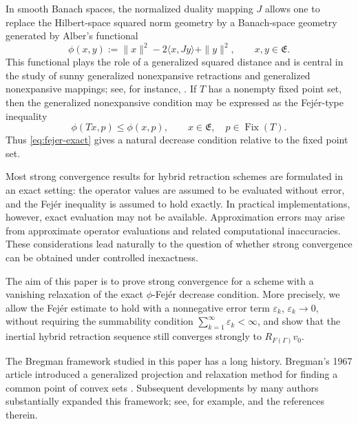 \documentclass[leqno,12pt]{amsart}
\theoremstyle{definition}
\theoremstyle{remark}
\numberwithin{equation}{section}
\newcommand{\E}{\mathfrak{E}}
\newcommand{\Fix}{\operatorname{Fix}}
\begin{document}
In smooth Banach spaces, the normalized duality mapping \(J\) allows one to
replace the Hilbert-space squared norm geometry by a Banach-space geometry
generated by Alber's functional
\begin{equation}\label{eq:intro-phi}
\phi(x,y):=\|x\|^{2}-2\langle x,Jy\rangle+\|y\|^{2},
\qquad x,y\in \E.
\end{equation}
This functional plays the role of a generalized squared distance and is central
in the study of sunny generalized nonexpansive retractions and generalized
nonexpansive mappings; see, for instance,
\cite{Alber1996,IbarakiTakahashi2010,KohsakaTakahashi2007}. If \(T\)
has a nonempty fixed point set, then the generalized nonexpansive condition may
be expressed as the Fej\'er-type inequality
\begin{equation}\label{eq:fejer-exact}
\phi(Tx,p)\leq \phi(x,p),
\qquad x\in \E,\quad p\in \Fix(T).
\end{equation}
Thus \eqref{eq:fejer-exact} gives a natural decrease condition relative to the
fixed point set.

Most strong convergence results for hybrid retraction schemes are formulated in
an exact setting: the operator values are assumed to be evaluated without error,
and the Fej\'er inequality is assumed to hold exactly. In practical
implementations, however, exact evaluation may not be available. Approximation
errors may arise from approximate operator evaluations and related computational
inaccuracies. These considerations lead naturally to the question of whether
strong convergence can be obtained under controlled inexactness.

The aim of this paper is to prove strong convergence for a scheme with a
vanishing relaxation of the exact \(\phi\)-Fej\'er decrease condition. More
precisely, we allow the Fej\'er estimate to hold with a nonnegative error term \(\varepsilon_k\), 
\(\varepsilon_k\to0\), without requiring the summability condition
\(\sum_{k=1}^{\infty}\varepsilon_k<\infty\), and show that the inertial hybrid
retraction sequence still converges strongly to \(R_{F(\Gamma)}v_0\).

The Bregman framework studied in this paper has a long history. Bregman's 1967
article introduced a generalized projection and relaxation method for finding a
common point of convex sets \cite{Bregman1967}. Subsequent developments by many
authors substantially expanded this framework; see, for example,
\cite{CensorLent1981,CensorZenios1992,BauschkeBorwein1997,
ButnariuIusem2000,KohsakaTakahashi2005} and the references therein.
\end{document}
